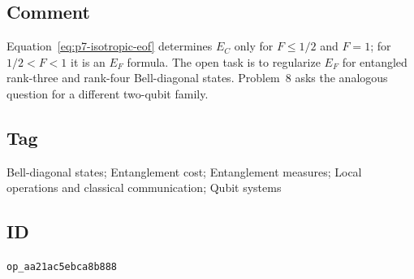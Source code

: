 \subsection*{Comment}

Equation~\eqref{eq:p7-isotropic-eof} determines $E_C$ only for $F\leq1/2$
and $F=1$; for $1/2<F<1$ it is an $E_F$ formula.  The open task is to
regularize $E_F$ for entangled rank-three and rank-four Bell-diagonal states.
Problem~8 asks the analogous question for a different two-qubit family.

\subsection*{Tag}

Bell-diagonal states; Entanglement cost; Entanglement measures;
Local operations and classical communication; Qubit systems

\subsection*{ID}

\texttt{op\_aa21ac5ebca8b888}
